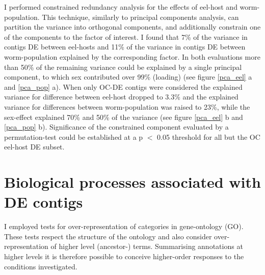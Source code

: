 I performed constrained redundancy analysis for the effects of
eel-host and worm-population. This technique, similarly to principal
components analysis, can partition the variance into orthogonal
components, and additionally constrain one of the components to the
factor of interest. I found that 7\% of the variance in contigs DE
between eel-hosts and 11\% of the variance in contigs DE between
worm-population explained by the corresponding factor. In both
evaluations more than 50\% of the remaining variance could be
explained by a single principal component, to which sex contributed
over 99\% (loading) (see figure \ref{pca_eel} a and \ref{pca_pop}
a). When only OC-DE contigs were considered the explained variance for
difference between eel-host dropped to 3.3\% and the explained
variance for differences between worm-population was raised to 23\%,
while the sex-effect explained 70\% and 50\% of the variance (see
figure \ref{pca_eel} b and \ref{pca_pop} b). Significance of the
constrained component evaluated by a permutation-test could be
established at a p $<$ 0.05 threshold for all but the OC eel-host DE
subset.



\afterpage{\clearpage}

\section{Biological processes associated with DE contigs}

I employed tests for over-representation of categories in
gene-ontology (GO). These tests respect the structure of the ontology
and also consider over-representation of higher level (ancestor-)
terms. Summarising annotations at higher levels it is therefore
possible to conceive higher-order responses to the conditions
investigated.

